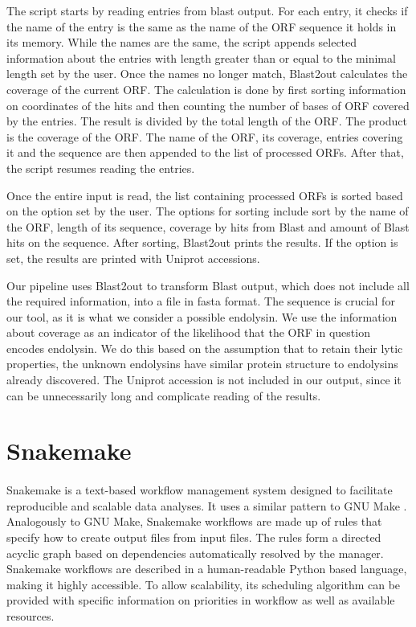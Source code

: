 The script starts by reading entries from blast output. For each entry, it checks if the name of the entry is the same as the name of the ORF sequence it holds in its memory. While the names are the same, the script appends selected information about the entries with length greater than or equal to the minimal length set by the user. Once the names no longer match, Blast2out calculates the coverage of the current ORF. The calculation is done by first sorting information on coordinates of the hits and then counting the number of bases of ORF covered by the entries. The result is divided by the total length of the ORF. The product is the coverage of the ORF. The name of the ORF, its coverage, entries covering it and the sequence are then appended to the list of processed ORFs. After that, the script resumes reading the entries.

Once the entire input is read, the list containing processed ORFs is sorted based on the option set by the user. The options for sorting include sort by the name of the ORF, length of its sequence, coverage by hits from Blast and amount of Blast hits on the sequence. After sorting, Blast2out prints the results. If the option is set, the results are printed with Uniprot accessions.

Our pipeline uses Blast2out to transform Blast output, which does not include all the required information, into a file in fasta format. The sequence is crucial for our tool, as it is what we consider a possible endolysin. We use the information about coverage as an indicator of the likelihood that the ORF in question encodes endolysin. We do this based on the assumption that to retain their lytic properties, the unknown endolysins have similar protein structure to endolysins already discovered. The Uniprot accession is not included in our output, since it can be unnecessarily long and complicate reading of the results.

\section{Snakemake}
\paragraph*{}
Snakemake\cite{koster2012snakemake} is a text-based workflow management system designed to facilitate reproducible and scalable data analyses. It uses a similar pattern to GNU Make \cite{stallman1991gnu}. Analogously to GNU Make, Snakemake workflows are made up of rules that specify how to create output files from input files. The rules form a directed acyclic graph based on dependencies automatically resolved by the manager. Snakemake workflows are described in a human-readable Python based language, making it highly accessible. To allow scalability, its scheduling algorithm can be provided with specific information on priorities in workflow as well as available resources.


